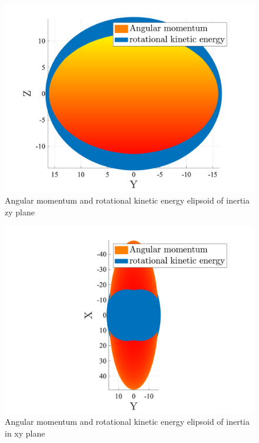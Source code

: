 \begin{figure}[H]
    \caption{Angular momentum and rotational kinetic energy elipsoid of inertia zy plane}
    \centering
    \includegraphics[width=12cm]{../Figure/Q1/yz_view}
\end{figure}

\begin{figure}[H]
    \caption{Angular momentum and rotational kinetic energy elipsoid of inertia in xy plane}
    \centering
    \includegraphics[width=12cm]{../Figure/Q1/xy_view}
\end{figure}